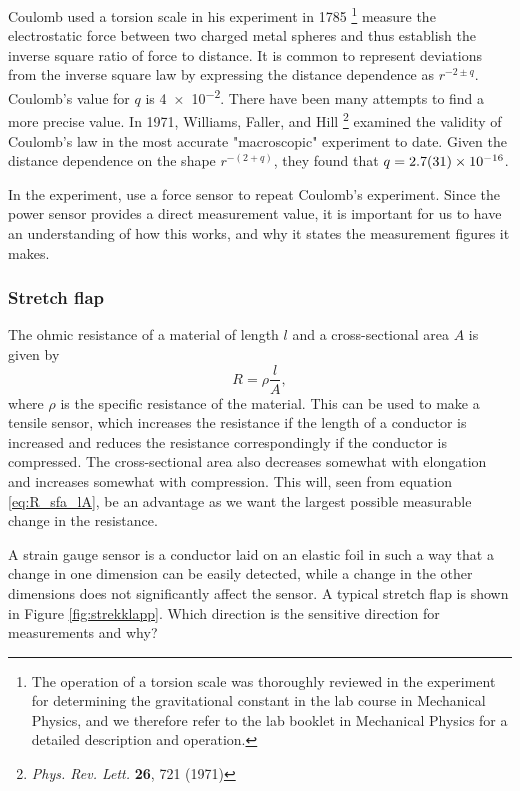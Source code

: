\documentclass[../Elmag-labhefte-2022.tex]{subfiles}
\begin{document}
Coulomb used a torsion scale in his experiment in 1785 \footnote{The operation of a torsion scale was thoroughly reviewed in the experiment for determining the gravitational constant in the lab course in Mechanical Physics, and we therefore refer to the lab booklet in Mechanical Physics for a detailed description and operation.} measure the electrostatic force between two charged metal spheres and thus establish the inverse square ratio of force to distance. It is common to represent deviations from the inverse square law by expressing the distance dependence as $r^{-2\pm q}$. Coulomb's value for $q$ is \num{4e-2}. There have been many attempts to find a more precise value. In 1971, Williams, Faller, and Hill \footnote{\textit{Phys. Rev. Lett.} \textbf{26}, 721 (1971)} examined the validity of Coulomb's law in the most accurate "macroscopic" experiment to date. Given the distance dependence on the shape $r^{-(2+q)}$, they found that $q = \num{2,7\pm3,1e-16}$.

In the experiment, use a force sensor to repeat Coulomb's experiment. Since the power sensor provides a direct measurement value, it is important for us to have an understanding of how this works, and why it states the measurement figures it makes.


\subsubsection{Stretch flap} \vspace{-5mm}
The ohmic resistance of a material of length $l$ and a cross-sectional area $A$ is given by
\begin{equation}
    R = \rho \frac{l}{A},
    \label{eq:R_sfa_lA}
\end{equation}
where $\rho$ is the specific resistance of the material. This can be used to make a tensile sensor, which increases the resistance if the length of a conductor is increased and reduces the resistance correspondingly if the conductor is compressed. The cross-sectional area also decreases somewhat with elongation and increases somewhat with compression. This will, seen from equation \eqref{eq:R_sfa_lA}, be an advantage as we want the largest possible measurable change in the resistance.

A strain gauge sensor is a conductor laid on an elastic foil in such a way that a change in one dimension can be easily detected, while a change in the other dimensions does not significantly affect the sensor. A typical stretch flap is shown in Figure \ref{fig:strekklapp}. Which direction is the sensitive direction for measurements and why?
\end{document}
